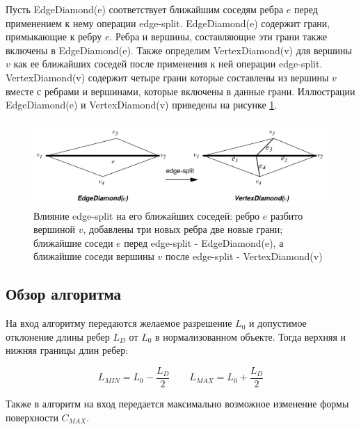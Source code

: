 \documentclass[14pt]{article}
\numberwithin{figure}{section}
\numberwithin{equation}{section}
\begin{document}
Пусть EdgeDiamond(e) соответствует ближайшим соседям ребра $e$ перед применением к нему операции edge-split. EdgeDiamond(e) содержит грани, примыкающие к ребру $e$. Ребра и вершины, составляющие эти грани также включены в EdgeDiamond(e). Также определим VertexDiamond(v) для вершины $v$ как ее ближайших соседей после применения к ней операции edge-split. VertexDiamond(v) содержит четыре грани которые составлены из вершины $v$ вместе с ребрами и вершинами, которые включены в данные грани. Иллюстрации EdgeDiamond(e) и VertexDiamond(v) приведены на рисунке \ref{ris:mc3}.

\begin{figure}
	\begin{center}
		\includegraphics[scale = 0.25]{mc3.JPG}
		\caption{Влияние edge-split на его ближайших соседей: ребро $e$ разбито вершиной $v$, добавлены три новых ребра две новые грани; ближайшие соседи $e$ перед edge-split - EdgeDiamond(e), а ближайшие соседи вершины $v$ после edge-split - VertexDiamond(v)}
		\label{ris:mc3}
	\end{center}
\end{figure}

\subsection{Обзор алгоритма}

На вход алгоритму передаются желаемое разрешение $L_0$ и допустимое отклонение длины ребер $L_D$ от $L_0$ в нормализованном объекте. Тогда верхняя и нижняя границы длин ребер:

\begin{equation}
	L_{MIN} = L_0 - \frac{L_D}{2} \qquad L_{MAX} = L_0 + \frac{L_D}{2}
\end{equation}

Также в алгоритм на вход передается максимально возможное изменение формы поверхности $C_{MAX}$.
\end{document}
